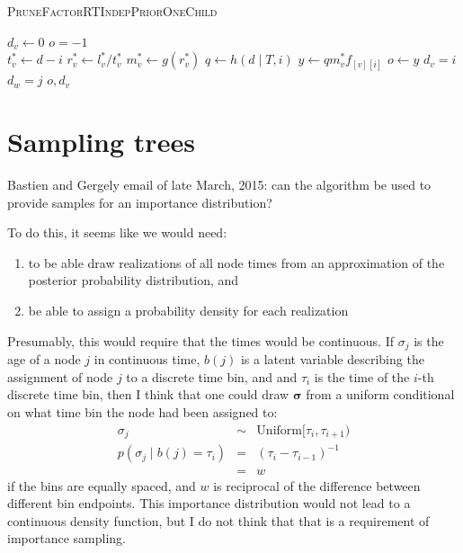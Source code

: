 \documentclass{llncs}
\newcommand{\tree}[0]{\ensuremath{T}\xspace}
\newcommand{\timebin}[0]{\ensuremath{\tau}\xspace}
\newcommand{\contTime}[1]{\ensuremath{\sigma}_{#1}\xspace}
\newcommand{\contTimeVec}[0]{\ensuremath{\bm{\sigma}}\xspace}
\newcommand{\binFor}[1]{\ensuremath{b({#1})}\xspace}
\newcommand{\subtreeOptFactor}[2]{\ensuremath{f_{[{#1}][{#2}]}}\xspace}
\newcommand{\ratePriorDensity}[0]{\ensuremath{g}\xspace}
\newcommand{\timePriorDensity}[0]{\ensuremath{h}\xspace}
\begin{document}
\begin{algorithm} \caption{\textsc{PruneFactorRTIndepPriorOneChild}}\label{pruneFactorRTIndepOneChild}
\begin{algorithmic}
\STATE $d_v\leftarrow 0$
\STATE $o = -1$ \\
\FOR{$i \in [0, 1, \ldots, d)$ }
    \STATE $t_v^{\ast} \leftarrow d - i$
    \STATE $r_v^{\ast} \leftarrow l_v^{\ast} / t_v^{\ast}$
    \STATE $m_v^{\ast} \leftarrow \ratePriorDensity(r_v^{\ast})$
    \STATE $q \leftarrow \timePriorDensity(d \mid \tree, i)$
    \STATE $y \leftarrow q m_v^{\ast}\subtreeOptFactor{v}{i}$
        \STATE $o \leftarrow y$
        \STATE $d_v = i$
        \STATE $d_w = j$
    \ENDIF
\ENDFOR
\RETURN $o, d_v$
\end{algorithmic}
\end{algorithm}

\newpage




\section{Sampling trees}
Bastien and Gergely email of late March, 2015: can the 
algorithm be used to provide samples for an importance distribution?

To do this, it seems like we would need:
\begin{enumerate}
    \item to be able draw realizations of all node times from an approximation of
     the posterior probability distribution, and
    \item be able to assign a probability density for each realization
\end{enumerate}

Presumably, this would require that the times would be continuous.
If $\contTime{j}$ is the age of a node $j$ in continuous time,
    $\binFor{j}$ is a latent variable describing the assignment of node
    $j$ to a discrete time bin, and
    and $\timebin_i$ is the time of the $i$-th discrete time bin, then I think that one could
    draw $\contTimeVec$ from a uniform conditional on what time bin the 
    node had been assigned to:
\begin{eqnarray}
    \contTime{j} & \sim & \mbox{Uniform}[\timebin_i, \timebin_{i+1}) \\
    p(\contTime{j} \mid \binFor{j} = \timebin_i) & = & \left(\timebin_{i} - \timebin_{i - 1}\right)^{-1}\\
    & = & w
\end{eqnarray}
if the bins are equally spaced, and $w$ is reciprocal of the
difference between different bin endpoints.
This importance distribution would not lead to a continuous density function, but I do
    not think that that is a requirement of importance sampling.
\end{document}
